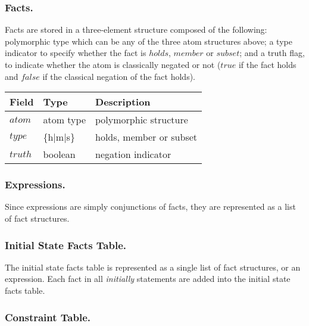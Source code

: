 \documentclass[global,twocolumn,final]{svjour}
\newenvironment{vquote}
  {\begin{list}{}{\leftmargin 1em}\item[]}
  {\end{list}}
\begin{document}
      \subsubsection{Facts.}

        Facts are stored in a three-element structure composed of the
        following: polymorphic type which can be any of the three atom
        structures above; a type indicator to specify whether the fact is
        $holds$, $member$ or $subset$; and a truth flag, to indicate whether the
        atom is classically negated or not ($true$ if the fact holds
        and $false$ if the classical negation of the fact holds).

        \begin{vquote}
          \begin{tabular}[t]{|l|l|l|}
            \hline
            \textbf{Field} & \textbf{Type} & \textbf{Description} \\
            \hline
            $atom$ & atom type & polymorphic structure \\
            \hline
            $type$ & \{h$|$m$|$s\} & holds, member or subset \\
            \hline
            $truth$ & boolean & negation indicator \\
            \hline
          \end{tabular}
        \end{vquote}

      \subsubsection{Expressions.}

        Since expressions are simply conjunctions of facts, they are
        represented as a list of fact structures.

      \subsubsection{Initial State Facts Table.}

        The initial state facts table is represented as a single list of
        fact structures, or an expression. Each fact in all {\em initially}
        statements are added into the initial state facts table.

      \subsubsection{Constraint Table.}
\end{document}
